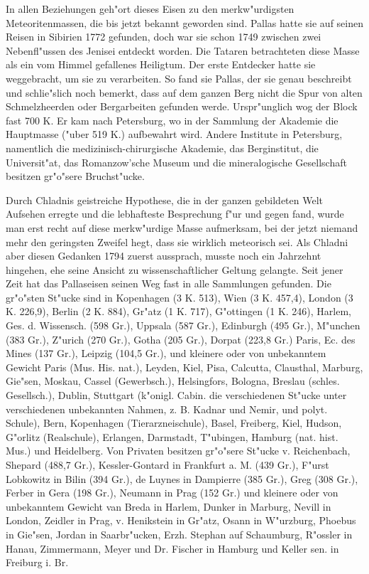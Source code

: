 \documentclass[a4paper, 11pt, oneside]{article}
\begin{document}
In allen Beziehungen geh"ort dieses Eisen zu den merkw"urdigsten Meteoritenmassen, die bis jetzt bekannt geworden sind. Pallas hatte sie auf seinen Reisen in Sibirien 1772 gefunden, doch war sie schon 1749 zwischen zwei Nebenfl"ussen des Jenisei entdeckt worden. Die Tataren betrachteten diese Masse als ein vom Himmel gefallenes Heiligtum. Der erste Entdecker hatte sie weggebracht, um sie zu verarbeiten. So fand sie Pallas, der sie genau beschreibt und schlie"slich noch bemerkt, dass auf dem ganzen Berg nicht die Spur von alten Schmelzheerden oder Bergarbeiten gefunden werde. Urspr"unglich wog der Block fast 700 K. Er kam nach Petersburg, wo in der Sammlung der Akademie die Hauptmasse ("uber 519 K.) aufbewahrt wird. Andere Institute in Petersburg, namentlich die medizinisch-chirurgische Akademie, das Berginstitut, die Universit"at, das Romanzow'sche Museum und die mineralogische Gesellschaft besitzen gr"o"sere Bruchst"ucke.

Durch Chladnis geistreiche Hypothese, die in der ganzen gebildeten Welt Aufsehen erregte und die lebhafteste Besprechung f"ur und gegen fand, wurde man erst recht auf diese merkw"urdige Masse aufmerksam, bei der jetzt niemand mehr den geringsten Zweifel hegt, dass sie wirklich meteorisch sei. Als Chladni aber diesen Gedanken 1794 zuerst aussprach, musste noch ein Jahrzehnt hingehen, ehe seine Ansicht zu wissenschaftlicher Geltung gelangte. Seit jener Zeit hat das Pallaseisen seinen Weg fast in alle Sammlungen gefunden. Die gr"o"sten St"ucke sind in Kopenhagen (3 K. 513), Wien (3 K. 457,4), London (3 K. 226,9), Berlin (2 K. 884), Gr"atz (1 K. 717), G"ottingen (1 K. 246), Harlem, Ges. d. Wissensch. (598 Gr.), Uppsala (587 Gr.), Edinburgh (495 Gr.), M"unchen (383 Gr.), Z"urich (270 Gr.), Gotha (205 Gr.), Dorpat (223,8 Gr.) Paris, Ec. des Mines (137 Gr.), Leipzig (104,5 Gr.), und kleinere oder von unbekanntem Gewicht Paris (Mus. His. nat.), Leyden, Kiel, Pisa, Calcutta, Clausthal, Marburg, Gie"sen, Moskau, Cassel (Gewerbsch.), Helsingfors, Bologna, Breslau (schles. Gesellsch.), Dublin, Stuttgart (k"onigl. Cabin. die verschiedenen St"ucke unter verschiedenen unbekannten Nahmen, z. B. Kadnar und Nemir, und polyt. Schule), Bern, Kopenhagen (Tierarzneischule), Basel, Freiberg, Kiel, Hudson, G"orlitz (Realschule), Erlangen, Darmstadt, T"ubingen, Hamburg (nat. hist. Mus.) und Heidelberg. Von Privaten besitzen gr"o"sere St"ucke v. Reichenbach, Shepard (488,7 Gr.), Kessler-Gontard in Frankfurt a. M. (439 Gr.), F"urst Lobkowitz in Bilin (394 Gr.), de Luynes in Dampierre (385 Gr.), Greg (308 Gr.), Ferber in Gera (198 Gr.), Neumann in Prag (152 Gr.) und kleinere oder von unbekanntem Gewicht van Breda in Harlem, Dunker in Marburg, Nevill in London, Zeidler in Prag, v. Henikstein in Gr"atz, Osann in W"urzburg, Phoebus in Gie"sen, Jordan in Saarbr"ucken, Erzh. Stephan auf Schaumburg, R"ossler in Hanau, Zimmermann, Meyer und Dr. Fischer in Hamburg und Keller sen. in Freiburg i. Br.
\end{document}
